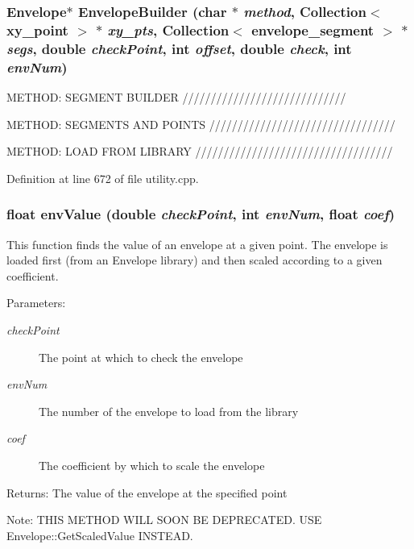 \subsubsection{\setlength{\rightskip}{0pt plus 5cm}Envelope$\ast$ Envelope\-Builder (char $\ast$ {\em method}, Collection$<$ xy\_\-point $>$ $\ast$ {\em xy\_\-pts}, Collection$<$ envelope\_\-segment $>$ $\ast$ {\em segs}, double {\em check\-Point}, int {\em offset}, double {\em check}, int {\em env\-Num})}\label{utility_8cpp_a15}


METHOD: SEGMENT BUILDER /////////////////////////////

METHOD: SEGMENTS AND POINTS /////////////////////////////////

METHOD: LOAD FROM LIBRARY /////////////////////////////////// 

Definition at line 672 of file utility.cpp.
\subsubsection{\setlength{\rightskip}{0pt plus 5cm}float env\-Value (double {\em check\-Point}, int {\em env\-Num}, float {\em coef})}\label{utility_8cpp_a17}


This function finds the value of an envelope at a given point. The envelope is loaded first (from an Envelope library) and then scaled according to a given coefficient. \begin{Desc}
\item[Parameters:]
\begin{description}
\item[{\em check\-Point}]The point at which to check the envelope \item[{\em env\-Num}]The number of the envelope to load from the library \item[{\em coef}]The coefficient by which to scale the envelope \end{description}
\end{Desc}
\begin{Desc}
\item[Returns:]The value of the envelope at the specified point \end{Desc}
\begin{Desc}
\item[Note:]THIS METHOD WILL SOON BE DEPRECATED. USE Envelope::Get\-Scaled\-Value INSTEAD. \end{Desc}



